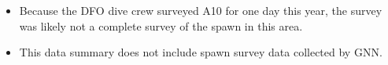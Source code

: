 \begin{itemize}
\item Because the DFO dive crew surveyed A10 for one day this year,
the survey was likely not a complete survey of the spawn in this area.
\item This data summary does not include spawn survey data collected by GNN.
\end{itemize}